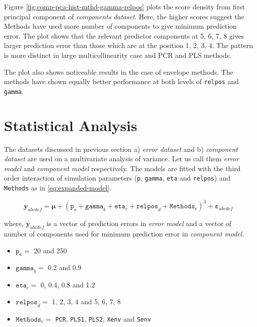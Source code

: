 \documentclass[12pt,3p,authoryear]{elsarticle}
\providecommand{\tightlist}{%
  \setlength{\itemsep}{0pt}\setlength{\parskip}{0pt}}
\begin{document}
Figure \ref{fig:comp-pca-hist-mthd-gamma-relpos} plots the score density
from first principal component of \emph{components dataset}. Here, the
higher scores suggest the Methods have used more number of components to
give minimum prediction error. The plot shows that the relevant
predictor components at 5, 6, 7, 8 gives larger prediction error than
those which are at the position 1, 2, 3, 4. The pattern is more distinct
in large multicollinearity case and PCR and PLS methods.

The plot also shows noticeable results in the case of envelope methods.
The methods have shown equally better performance at both levels of
\texttt{relpos} and \texttt{gamma}.

\hypertarget{statistical-analysis}{%
\section{Statistical Analysis}\label{statistical-analysis}}

The datasets discussed in previous section a) \emph{error dataset} and
b) \emph{component dataset} are used on a multivariate analysis of
variance. Let us call them \emph{error model} and \emph{component model}
respectively. The models are fitted with the third order interaction of
simulation parameters (\texttt{p}, \texttt{gamma}, \texttt{eta} and
\texttt{relpos}) and \texttt{Methods} as in \eqref{eq:expanded-model}.

\begin{equation}
\mathbf{y}_{abcdef} = \boldsymbol{\mu} + (\texttt{p}_a + \texttt{gamma}_b + \texttt{eta}_c + \texttt{relpos}_d + \texttt{Methods}_e)^3 + \boldsymbol{\varepsilon}_{abcdef}
\label{eq:expanded-model}
\end{equation}

where, \(\mathbf{y}_{abcdef}\) is a vector of prediction errors in
\emph{error model} and a vector of number of components used for minimum
prediction error in \emph{component model}.

\begin{itemize}
\tightlist
\item
  \(\texttt{p}_a =\) 20 and 250
\item
  \(\texttt{gamma}_b=\) 0.2 and 0.9
\item
  \(\texttt{eta}_c=\) 0, 0.4, 0.8 and 1.2
\item
  \(\texttt{relpos}_d=\) 1, 2, 3, 4 and 5, 6, 7, 8
\item
  \(\texttt{Methods}_e=\) \texttt{PCR}, \texttt{PLS1}, \texttt{PLS2},
  \texttt{Xenv} and \texttt{Senv}
\end{itemize}
\end{document}
